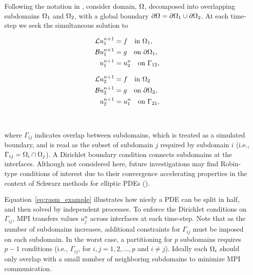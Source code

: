\documentclass{report}
\begin{document}
Following the notation in \cite{StCyr2007}, consider domain, $\Omega$, decomposed into overlapping subdomains $\Omega_1$ and $\Omega_2$, with a global boundary $\partial \Omega = \partial \Omega_1 \cup \partial \Omega_2$. At each time-step we seek the simultaneous solution to
\begin{center}
\begin{minipage}{0.4\linewidth}
\begin{align*}
\mathcal{L}u_{1}^{n+1} & = f \ \ \text{ in }\Omega_1,\\
\mathcal{B}u_{1}^{n+1} &= g \ \ \text{ on }\partial \Omega_1, \\
u_{1}^{n+1} & = u_2^{n} \ \ \text{ on }\Gamma_{12}, 
\end{align*}
\end{minipage}
\begin{minipage}{0.4\linewidth} 
\begin{align}
\mathcal{L}u_{2}^{n+1} & = f \ \ \text{ in }\Omega_2 \nonumber \\
\mathcal{B}u_{2}^{n+1} & = g \ \ \text{ on }\partial \Omega_2, \label{eq:rasm_example} \\
u_{2}^{n+1} & = u_1^{n} \ \ \text{ on }\Gamma_{21},  \nonumber
\end{align}
\end{minipage}
\end{center}
\ 

\noindent where $\Gamma_{ij}$ indicates overlap between subdomains, which is treated as a simulated boundary, and is read as the subset of subdomain $j$ required by subdomain $i$ (i.e., $\Gamma_{ij} = \Omega_i \cap \Omega_j$). A Dirichlet boundary condition connects subdomains at the interfaces. Although not considered here, future investigations may find Robin-type conditions of interest due to their convergence accelerating properties in the context of Schwarz methods for elliptic PDEs (\cite{StCyr2007}). 

Equation~\ref{eq:rasm_example} illustrates how nicely a PDE can be split in half, and then solved by independent processes. To enforce the Dirichlet conditions on $\Gamma_{ij}$, MPI transfers values $u_j^{n}$ across interfaces at each time-step. Note that as the number of subdomains increases, additional constraints for $\Gamma_{ij}$ must be imposed on each subdomain. In the worst case, a partitioning for $p$ subdomains requires $p-1$ conditions (i.e., $\Gamma_{ij}$, for $i,j=1,2,...,p$ and $i \neq j$). Ideally each $\Omega_i$ should only overlap with a small number of neighboring subdomains to minimize MPI communication. 
\end{document}
